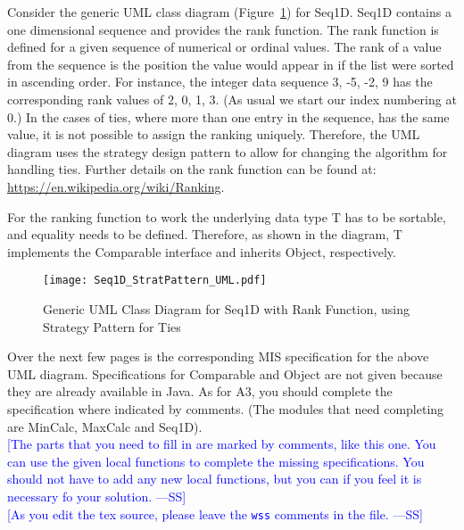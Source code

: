 \documentclass[12pt,fleqn]{examtst}
\newcommand{\authornote}[3]{\textcolor{#1}{[#3 ---#2]}}
\newcommand{\authornote}[3]{}
\newcommand{\wss}[1]{\authornote{blue}{SS}{#1}}
\begin{document}
Consider the generic UML class diagram (Figure~\ref{Fig_UML_Strategy}) for
Seq1D.  Seq1D contains a one dimensional sequence and provides the rank
function.  The rank function is defined for a given sequence of numerical or
ordinal values.  The rank of a value from the sequence is the position the value
would appear in if the list were sorted in ascending order.  For instance, the
integer data sequence 3, -5, -2, 9 has the corresponding rank values of 2, 0, 1,
3.  (As usual we start our index numbering at 0.)  In the cases of ties, where
more than one entry in the sequence, has the same value, it is not possible to
assign the ranking uniquely.  Therefore, the UML diagram uses the strategy
design pattern to allow for changing the algorithm for handling ties.  Further
details on the rank function can be found at:
\url{https://en.wikipedia.org/wiki/Ranking}.

For the ranking function to work the underlying data type T has to be sortable,
and equality needs to be defined.  Therefore, as shown in the diagram, T
implements the Comparable interface and inherits Object, respectively.

\begin{figure}[!h]
\begin{center}
\texttt{[image: Seq1D\_StratPattern\_UML.pdf]}
\end{center}
\caption{Generic UML Class Diagram for Seq1D with Rank Function, using Strategy Pattern
  for Ties} \label{Fig_UML_Strategy}
\end{figure}

 
\newpage

\noindent
\begin{minipage}{\textwidth}
 \label{Q_CompleteMIS}

Over the next few pages is the corresponding MIS specification for the above UML
diagram.  Specifications for Comparable and Object are not given because they
are already available in Java.  As for A3, you should complete the specification
where indicated by comments.  (The modules that need completing are MinCalc,
MaxCalc and Seq1D).\\

\wss{The parts that you need to fill in are marked by comments, like this one.
You can use the given local functions to complete the missing specifications.
You should not have to add any new local functions, but you can if you feel it
is necessary fo your solution.}\\

\wss{As you edit the tex source, please leave the \texttt{wss} comments in the
  file.}\\

\end{minipage}
\end{document}
